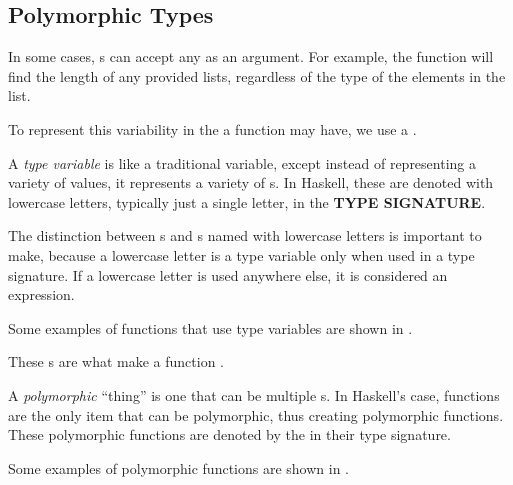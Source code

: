 \subsection{Polymorphic Types}\label{subsec:Polymorphic_Types}
In some cases, s can accept any  as an argument.
For example, the  function will find the length of any provided lists, regardless of the type of the elements in the list.

To represent this variability in the  a function may have, we use a .

\begin{definition}\label{def:Type_Variable}
  A \emph{type variable} is like a traditional variable, except instead of representing a variety of values, it represents a variety of s.
  In Haskell, these are denoted with lowercase letters, typically just a single letter, in the \textbf{TYPE SIGNATURE}.
  \begin{remark}
    The distinction between s and s named with lowercase letters is important to make, because a lowercase letter is a type variable only when used in a type signature.
    If a lowercase letter is used anywhere else, it is considered an expression.
  \end{remark}

  Some examples of functions that use type variables are shown in .
\end{definition}

These s are what make a function .

\begin{definition}[Polymorphic]\label{def:Polymorphic}
  A \emph{polymorphic} ``thing'' is one that can be multiple s.
  In Haskell's case, functions are the only item that can be polymorphic, thus creating polymorphic functions.
  These polymorphic functions are denoted by the  in their type signature.

  Some examples of polymorphic functions are shown in .
\end{definition}

